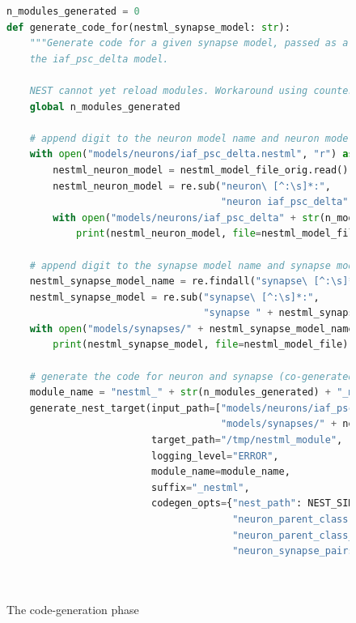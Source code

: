 \begin{figure}[ht!]
\caption{The code-generation phase}
\begin{lstlisting}[language=Python, label=lst:generating_code]
n_modules_generated = 0
def generate_code_for(nestml_synapse_model: str):
    """Generate code for a given synapse model, passed as a string, in combination with
    the iaf_psc_delta model.

    NEST cannot yet reload modules. Workaround using counter to generate unique names."""
    global n_modules_generated

    # append digit to the neuron model name and neuron model filename
    with open("models/neurons/iaf_psc_delta.nestml", "r") as nestml_model_file_orig:
        nestml_neuron_model = nestml_model_file_orig.read()
        nestml_neuron_model = re.sub("neuron\ [^:\s]*:",
                                     "neuron iaf_psc_delta" + str(n_modules_generated) + ":", nestml_neuron_model)
        with open("models/neurons/iaf_psc_delta" + str(n_modules_generated) + ".nestml", "w") as nestml_model_file_mod:
            print(nestml_neuron_model, file=nestml_model_file_mod)

    # append digit to the synapse model name and synapse model filename
    nestml_synapse_model_name = re.findall("synapse\ [^:\s]*:", nestml_synapse_model)[0][8:-1]
    nestml_synapse_model = re.sub("synapse\ [^:\s]*:",
                                  "synapse " + nestml_synapse_model_name + str(n_modules_generated) + ":", nestml_synapse_model)
    with open("models/synapses/" + nestml_synapse_model_name + str(n_modules_generated) + ".nestml", "w") as nestml_model_file:
        print(nestml_synapse_model, file=nestml_model_file)

    # generate the code for neuron and synapse (co-generated)
    module_name = "nestml_" + str(n_modules_generated) + "_module"
    generate_nest_target(input_path=["models/neurons/iaf_psc_delta" + str(n_modules_generated) + ".nestml",
                                     "models/synapses/" + nestml_synapse_model_name + str(n_modules_generated) + ".nestml"],
                         target_path="/tmp/nestml_module",
                         logging_level="ERROR",
                         module_name=module_name,
                         suffix="_nestml",
                         codegen_opts={"nest_path": NEST_SIMULATOR_INSTALL_LOCATION,
                                       "neuron_parent_class": "StructuralPlasticityNode",
                                       "neuron_parent_class_include": "structural_plasticity_node.h",
                                       "neuron_synapse_pairs": [{"neuron": "iaf_psc_delta" + str(n_modules_generated),
                                                                   "synapse": nestml_synapse_model_name + str(n_modules_generated),
                                                                   "post_ports": ["post_spikes"]}]})


\end{lstlisting}
\end{figure}
